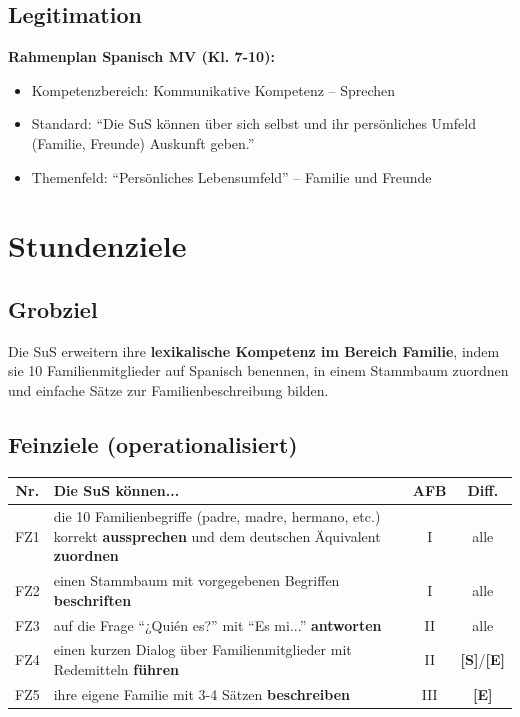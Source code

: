 \documentclass[11pt,a4paper]{article}
\newcommand{\Std}{\textcolor{standard}{\textbf{[S]}}}
\newcommand{\E}{\textcolor{erweiterung}{\textbf{[E]}}}
\begin{document}
\subsection{Legitimation}
\textbf{Rahmenplan Spanisch MV (Kl. 7-10):}
\begin{itemize}
    \item Kompetenzbereich: Kommunikative Kompetenz -- Sprechen
    \item Standard: ``Die SuS können über sich selbst und ihr persönliches Umfeld (Familie, Freunde) Auskunft geben.''
    \item Themenfeld: ``Persönliches Lebensumfeld'' -- Familie und Freunde
\end{itemize}

\section{Stundenziele}

\subsection{Grobziel}
Die SuS erweitern ihre \textbf{lexikalische Kompetenz im Bereich Familie}, indem sie 10 Familienmitglieder auf Spanisch benennen, in einem Stammbaum zuordnen und einfache Sätze zur Familienbeschreibung bilden.

\subsection{Feinziele (operationalisiert)}
\begin{tabular}{|c|p{7.5cm}|c|c|}
\hline
\textbf{Nr.} & \textbf{Die SuS können...} & \textbf{AFB} & \textbf{Diff.} \\
\hline
FZ1 & die 10 Familienbegriffe (padre, madre, hermano, etc.) korrekt \textbf{aussprechen} und dem deutschen Äquivalent \textbf{zuordnen} & I & alle \\
\hline
FZ2 & einen Stammbaum mit vorgegebenen Begriffen \textbf{beschriften} & I & alle \\
\hline
FZ3 & auf die Frage ``¿Quién es?'' mit ``Es mi...'' \textbf{antworten} & II & alle \\
\hline
FZ4 & einen kurzen Dialog über Familienmitglieder mit Redemitteln \textbf{führen} & II & \Std{}/\E{} \\
\hline
FZ5 & ihre eigene Familie mit 3-4 Sätzen \textbf{beschreiben} & III & \E{} \\
\hline
\end{tabular}
\end{document}

